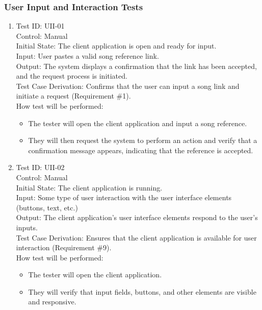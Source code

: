 \documentclass[12pt, titlepage]{article}
\begin{document}
\subsubsection{User Input and Interaction Tests}

\begin{enumerate}

\item Test ID: UII-01\\
Control: Manual\\
Initial State: The client application is open and ready for input.\\
Input: User pastes a valid song reference link.\\
Output: The system displays a confirmation that the link has been accepted, and the request process is initiated.\\
Test Case Derivation: Confirms that the user can input a song link and initiate a request (Requirement \#1).\\
How test will be performed: 
\begin{itemize}
    \item The tester will open the client application and input a song reference.
    \item They will then request the system to perform an action and verify that a confirmation message appears, indicating that the reference is accepted.
\end{itemize}

\item Test ID: UII-02\\
Control: Manual\\
Initial State: The client application is running.\\
Input: Some type of user interaction with the user interface elements (buttons, text, etc.)\\
Output: The client application’s user interface elements respond to the user’s inputs.\\
Test Case Derivation: Ensures that the client application is available for user interaction (Requirement \#9).\\
How test will be performed:
\begin{itemize}
    \item The tester will open the client application.
    \item They will verify that input fields, buttons, and other elements are visible and responsive.
\end{itemize}

\end{enumerate}
\end{document}
